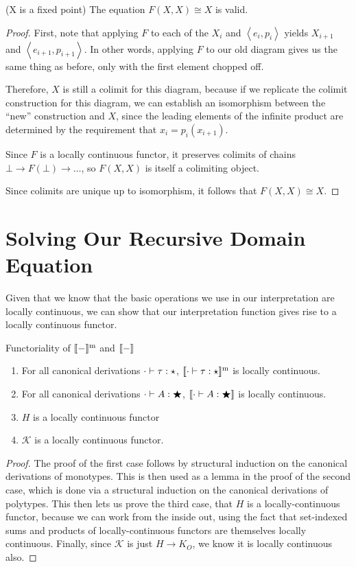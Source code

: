 \begin{lemma}{(X is a fixed point)} The equation $F(X, X) \cong X$
is valid.
\end{lemma}
\begin{proof}
First, note that applying $F$ to each of the $X_i$ and $\left<e_i,
p_i\right>$ yields $X_{i+1}$ and $\left<e_{i+1}, p_{i+1}\right>$.  In
other words, applying $F$ to our old diagram gives us the same thing
as before, only with the first element chopped off.

Therefore, $X$ is still a colimit for this diagram, because if we
replicate the colimit construction for this diagram, we can establish
an isomorphism between the ``new'' construction and $X$, since the
leading elements of the infinite product are determined by the
requirement that $x_i = p_i(x_{i+1})$.

Since $F$ is a locally continuous functor, it preserves colimits of
chains $\bot \longrightarrow F(\bot) \longrightarrow \ldots$, so $F(X,
X)$ is itself a colimiting object. 

Since colimits are unique up to isomorphism, it follows that $F(X, X)
\cong X$. 
\end{proof}

\section{Solving Our Recursive Domain Equation}

Given that we know that the basic operations we use in our
interpretation are locally continuous, we can show that our
interpretation function gives rise to a locally continuous functor.

\begin{lemma}{Functoriality of $\interpmono{-}$ and $\interp{-}$}
  \begin{enumerate}
  \item For all canonical derivations $\judgeWK[\cdot]{\tau}{\star}$, 
    $\interpmono{\judgeWK[\cdot]{\tau}{\star}}$ is locally continuous. 
  \item For all canonical derivations $\judgeWK[\cdot]{A}{\bigstar}$, 
    $\interp{\judgeWK[\cdot]{A}{\bigstar}}$ is locally continuous. 
  \item $H$ is a locally continuous functor
  \item $\mathcal{K}$ is a locally continuous functor. 
  \end{enumerate}
\end{lemma}

\begin{proof}
 The proof of the first case follows by structural
induction on the canonical derivations of monotypes. This is then used
as a lemma in the proof of the second case, which is done via a
structural induction on the canonical derivations of polytypes. This
then lets us prove the third case, that $H$ is a locally-continuous
functor, because we can work from the inside out, using the fact that
set-indexed sums and products of locally-continuous functors are
themselves locally continuous. Finally, since $\mathcal{K}$ is just 
$H \to K_O$, we know it is locally continuous also. 
\end{proof}

